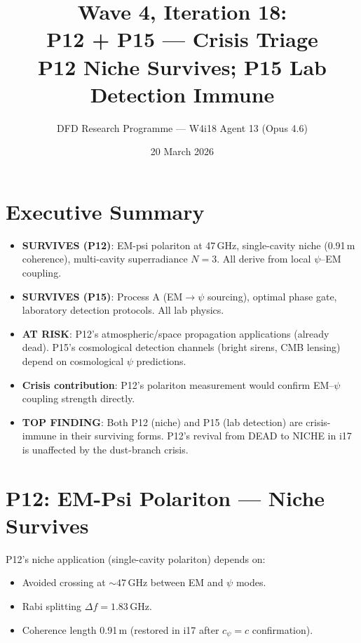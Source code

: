 \documentclass[11pt]{article}
\title{\textbf{Wave 4, Iteration 18:}\\
\textbf{P12 + P15 --- Crisis Triage}\\[6pt]
{\large P12 Niche Survives; P15 Lab Detection Immune}}
\author{DFD Research Programme --- W4i18 Agent 13 (Opus 4.6)}
\date{20 March 2026}
\begin{document}
\maketitle

\section*{Executive Summary}

\begin{tcolorbox}[colback=green!5!white, colframe=green!70!black,
  title=\textbf{W4i18: P12 NICHE SURVIVES, P15 LAB DETECTION IMMUNE}]

\begin{itemize}
\item \textbf{SURVIVES (P12)}: EM-psi polariton at 47\,GHz, single-cavity
  niche (0.91\,m coherence), multi-cavity superradiance $N=3$. All
  derive from local $\psi$--EM coupling.
\item \textbf{SURVIVES (P15)}: Process A (EM$\to\psi$ sourcing),
  optimal phase gate, laboratory detection protocols. All lab physics.
\item \textbf{AT RISK}: P12's atmospheric/space propagation applications
  (already dead). P15's cosmological detection channels (bright sirens,
  CMB lensing) depend on cosmological $\psi$ predictions.
\item \textbf{Crisis contribution}: P12's polariton measurement would
  confirm EM--$\psi$ coupling strength directly.
\item \textbf{TOP FINDING}: Both P12 (niche) and P15 (lab detection)
  are crisis-immune in their surviving forms. P12's revival from DEAD
  to NICHE in i17 is unaffected by the dust-branch crisis.
\end{itemize}
\end{tcolorbox}

\section{P12: EM-Psi Polariton --- Niche Survives}

P12's niche application (single-cavity polariton) depends on:
\begin{itemize}
\item Avoided crossing at $\sim 47$\,GHz between EM and $\psi$ modes.
\item Rabi splitting $\Delta f = 1.83$\,GHz.
\item Coherence length 0.91\,m (restored in i17 after $c_\psi = c$
  confirmation).
\end{itemize}
\end{document}
